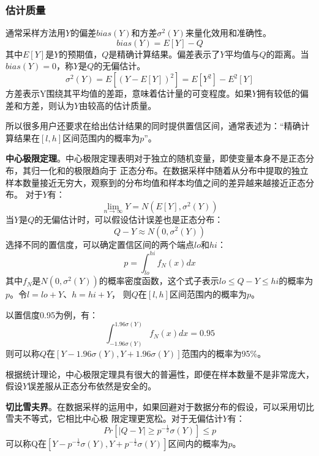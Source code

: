 \documentclass[master]{thesis-uestc}
\begin{document}
\subsubsection{估计质量}
\label{subsubsec:quality}
    通常采样方法用$Y$的偏差$bias(Y)$和方差$\sigma^2(Y)$来量化效用和准确性。
\begin{equation*}
    bias(Y)= E[Y]-Q
\end{equation*}
其中$E[Y]$是$Y$的预期值，$Q$是精确计算结果。偏差表示了$Y$平均值与$Q$的距离。当$bias(Y)=0$，称$Y$是$Q$的无偏估计。
\begin{equation*}
    \sigma^2(Y)= E[(Y - E[Y])^2]= E[Y^2] - E^2[Y]
\end{equation*}
方差表示Y围绕其平均值的差距，意味着估计量的可变程度。如果$Y$拥有较低的偏差和方差，则认为$Y$由较高的估计质量。

    所以很多用户还要求在给出估计结果的同时提供置信区间，通常表述为：“精确计算结果在$[l,h]$区间范围内的概率为$p$”。

    \textbf{中心极限定理}。中心极限定理表明对于独立的随机变量，即使变量本身不是正态分布，其归一化和的极限趋向于
正态分布。在数据采样中随着从分布中提取的独立样本数量接近无穷大，观察到的分布均值和样本均值之间的差异越来越接近正态分布。
对于$Y$有：
\begin{equation*}
    \lim_{n\rightarrow\infty}Y= N(E[Y], \sigma^2(Y))
\end{equation*}
当$Y$是$Q$的无偏估计时，可以假设估计误差也是正态分布：
\begin{equation*}
    Q-Y \approx N(0, \sigma^2(Y))
\end{equation*}
选择不同的置信度，可以确定置信区间的两个端点$lo$和$hi$：
\begin{equation*}
    p=\int_{lo}^{hi}f_N(x)dx
\end{equation*}
其中$f_N$是$N(0, \sigma^2(Y))$的概率密度函数，这个式子表示$lo \le Q-Y \le hi$的概率为$p$。令$l=lo+Y$、$h=hi+Y$，
则$Q$在$[l,h]$区间范围内的概率为$p$。

    以置信度0.95为例，有：
\begin{equation*}
    \int_{-1.96\sigma(Y)}^{1.96\sigma(Y)}f_N(x)dx=0.95
\end{equation*}
则可以称$Q$在$[Y-1.96\sigma(Y), Y+1.96\sigma(Y)]$范围内的概率为95\%。

    根据统计理论，中心极限定理具有很大的普遍性，即便在样本数量不是非常庞大，假设$Y$误差服从正态分布依然是安全的。

    \textbf{切比雪夫界}。在数据采样的运用中，如果回避对于数据分布的假设，可以采用切比雪夫不等式，它相比中心极
限定理更宽松。对于无偏估计$Y$有：
\begin{equation*}
    Pr\left[\vert Q-Y \vert \ge p^{-\frac{1}{2}}\sigma(Y) \right] \le p
\end{equation*}
可以称Q在$\left[ Y-p^{-\frac{1}{2}}\sigma(Y), Y+p^{-\frac{1}{2}}\sigma(Y) \right]$区间内的概率为$p$。
\end{document}
